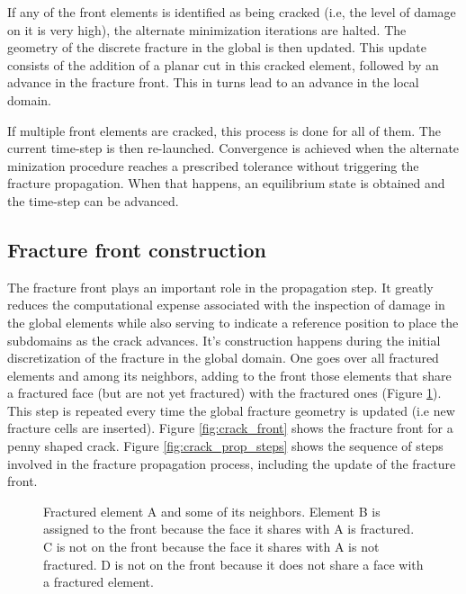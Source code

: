 If any of the front elements is identified as being cracked (i.e, the level of damage on it is very high), the alternate minimization iterations are halted. The geometry of the discrete fracture in the global is then updated. This update consists of the addition of a planar cut in this cracked element, followed by an advance in the fracture front. This in turns lead to an advance in the local domain.

If multiple front elements are cracked, this process is done for all of them. The current time-step is then re-launched. Convergence is achieved when the alternate minization procedure reaches a prescribed tolerance without triggering the fracture propagation. When that happens, an equilibrium state is obtained and the time-step can be advanced.

\subsection{Fracture front construction}\label{sec:front}

The fracture front plays an important role in the propagation step. It greatly reduces the computational expense associated with the inspection of damage in the global elements while also serving to indicate a reference position to place the subdomains as the crack advances. It's construction happens during the initial discretization of the fracture in the global domain. One goes over all fractured elements and among its neighbors, adding to the front those elements that share a fractured face (but are not yet fractured) with the fractured ones (Figure \ref{fig:front_faces}). This step is repeated every time the global fracture geometry is updated (i.e new fracture cells are inserted). Figure \ref{fig:crack_front} shows the fracture front for a penny shaped crack. Figure \ref{fig:crack_prop_steps} shows the sequence of steps involved in the fracture propagation process, including the update of the fracture front.

\begin{figure}[h]
  \centering
  \caption{Fractured element A and some of its neighbors. Element B is assigned to the front because the face it shares with A is fractured. C is not on the front because the face it shares with A is not fractured. D is not on the front because it does not share a face with a fractured element. }
  \label{fig:front_faces}
\end{figure}

